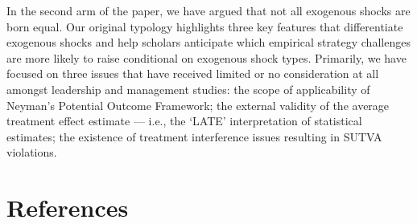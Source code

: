 \begin{refsection}
In the second arm of the paper, we have argued that not all exogenous shocks are
born equal. Our original typology highlights three key features that 
differentiate exogenous shocks and help scholars anticipate which empirical 
strategy challenges are more likely to raise conditional on exogenous shock
types. Primarily, we have focused on three issues that have received 
limited or no consideration at all amongst leadership and management studies:
the scope of applicability of Neyman's Potential Outcome Framework; the 
external validity of the average treatment effect estimate --- i.e., the `LATE' 
interpretation of statistical estimates; the existence of treatment interference
issues resulting in SUTVA violations.


%
\section*{References}
\printbibliography[heading=none]
\end{refsection}

